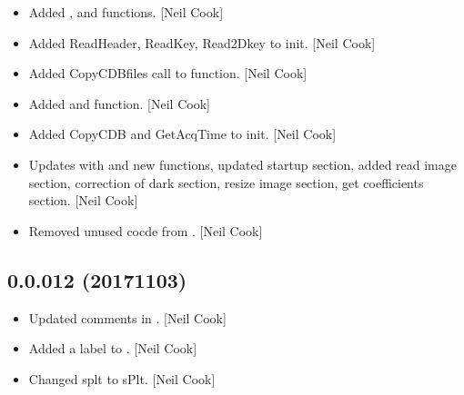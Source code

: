 \documentclass[a4paper,10pt,english]{report}
\begin{document}
\begin{itemize}
\item {} 
Added ,  and  functions. {[}Neil
Cook{]}

\item {} 
Added ReadHeader, ReadKey, Read2Dkey to init. {[}Neil Cook{]}

\item {} 
Added CopyCDBfiles call to  function. {[}Neil Cook{]}

\item {} 
Added  and  function. {[}Neil Cook{]}

\item {} 
Added CopyCDB and GetAcqTime to init. {[}Neil Cook{]}

\item {} 
Updates  with  and new functions, updated startup
section, added read image section, correction of dark section, resize
image section, get coefficients section. {[}Neil Cook{]}

\item {} 
Removed unused cocde from . {[}Neil Cook{]}

\end{itemize}


\subsection{0.0.012 (2017\sphinxhyphen{}11\sphinxhyphen{}03)}
\label{\detokenize{misc/changelog:id557}}\begin{itemize}
\item {} 
Updated comments in . {[}Neil Cook{]}

\item {} 
Added a label to . {[}Neil Cook{]}

\item {} 
Changed splt to sPlt. {[}Neil Cook{]}

\end{itemize}
\end{document}
